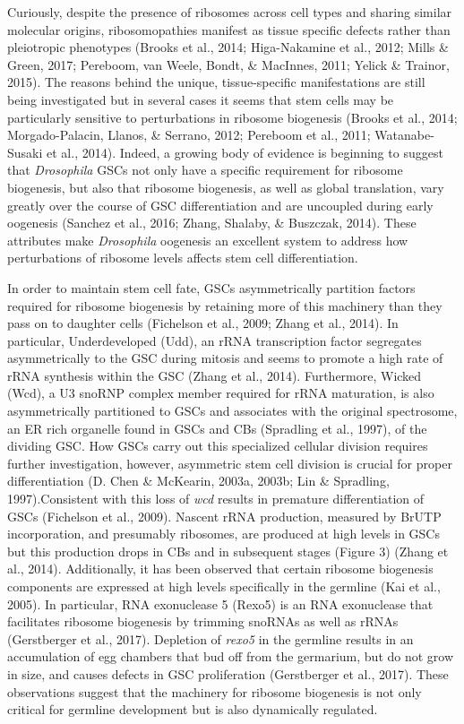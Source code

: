 \documentclass[12pt,twoside]{reedthesis}
\begin{document}
Curiously, despite the presence of ribosomes across cell types and
sharing similar molecular origins, ribosomopathies manifest as tissue
specific defects rather than pleiotropic phenotypes (Brooks et al., 2014; Higa-Nakamine et al., 2012; Mills \& Green, 2017; Pereboom, van Weele, Bondt, \& MacInnes, 2011; Yelick \& Trainor, 2015).
The reasons behind the unique, tissue-specific manifestations are still
being investigated but in several cases it seems that stem cells may be
particularly sensitive to perturbations in ribosome biogenesis
(Brooks et al., 2014; Morgado-Palacin, Llanos, \& Serrano, 2012; Pereboom et al., 2011; Watanabe-Susaki et al., 2014). Indeed, a growing body of evidence is beginning
to suggest that \emph{Drosophila} GSCs not only have a specific requirement
for ribosome biogenesis, but also that ribosome biogenesis, as well as
global translation, vary greatly over the course of GSC differentiation
and are uncoupled during early oogenesis (Sanchez et al., 2016; Zhang, Shalaby, \& Buszczak, 2014). These attributes make \emph{Drosophila} oogenesis an
excellent system to address how perturbations of ribosome levels affects
stem cell differentiation.

In order to maintain stem cell fate, GSCs asymmetrically partition
factors required for ribosome biogenesis by retaining more of this
machinery than they pass on to daughter cells (Fichelson et al., 2009; Zhang et al., 2014). In particular, Underdeveloped (Udd), an rRNA
transcription factor segregates asymmetrically to the GSC during mitosis
and seems to promote a high rate of rRNA synthesis within the GSC
(Zhang et al., 2014). Furthermore, Wicked (Wcd), a U3 snoRNP complex member
required for rRNA maturation, is also asymmetrically partitioned to GSCs
and associates with the original spectrosome, an ER rich organelle found
in GSCs and CBs (Spradling et al., 1997), of the dividing GSC. How GSCs
carry out this specialized cellular division requires further
investigation, however, asymmetric stem cell division is crucial for
proper differentiation (D. Chen \& McKearin, 2003a, 2003b; Lin \& Spradling, 1997).Consistent with this loss of \emph{wcd} results in premature
differentiation of GSCs (Fichelson et al., 2009). Nascent rRNA production,
measured by BrUTP incorporation, and presumably ribosomes, are produced
at high levels in GSCs but this production drops in CBs and in
subsequent stages (Figure 3) (Zhang et al., 2014). Additionally, it has been
observed that certain ribosome biogenesis components are expressed at
high levels specifically in the germline (Kai et al., 2005). In particular,
RNA exonuclease 5 (Rexo5) is an RNA exonuclease that facilitates
ribosome biogenesis by trimming snoRNAs as well as rRNAs
(Gerstberger et al., 2017). Depletion of \emph{rexo5} in the germline results in
an accumulation of egg chambers that bud off from the germarium, but do
not grow in size, and causes defects in GSC proliferation
(Gerstberger et al., 2017). These observations suggest that the machinery for
ribosome biogenesis is not only critical for germline development but is
also dynamically regulated.
\end{document}
